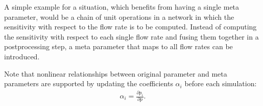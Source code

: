 A simple example for a situation, which benefits from having a single meta parameter, would be a chain of unit operations in a network in which the sensitivity with respect to the flow rate is to be computed.
Instead of computing the sensitivity with respect to each single flow rate and fusing them together in a postprocessing step, a meta parameter that maps to all flow rates can be introduced.

Note that nonlinear relationships between original parameter and meta parameters are supported by updating the coefficients $\alpha_i$ before each simulation:
\begin{align*}
	\alpha_i = \frac{\partial p_i}{\partial p}.
\end{align*}
